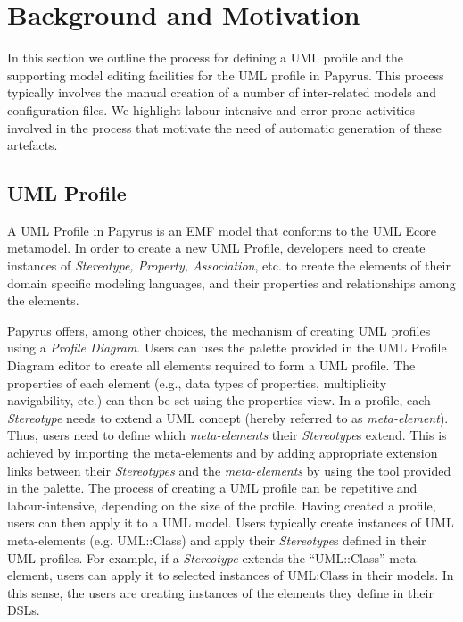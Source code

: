 \section{Background and Motivation}
\label{sec:background}

In this section we outline the process for defining a UML profile and the supporting model editing facilities for the UML profile in Papyrus. 
This process typically involves the manual creation of a number of inter-related models and configuration files.
We highlight labour-intensive and error prone activities involved in the process that motivate the need of automatic generation of these artefacts.

\subsection{UML Profile}
A UML Profile in Papyrus is an EMF model that conforms to the UML Ecore metamodel. 
In order to create a new UML Profile, developers need to create instances of \textit{Stereotype, Property, Association}, etc. to create the elements of their domain specific modeling languages, and their properties and relationships among the elements.

Papyrus offers, among other choices, the mechanism of creating UML profiles using a \textit{Profile Diagram}. 
Users can uses the palette provided in the UML Profile Diagram editor to
create all elements required to form a UML profile.
The properties of each element (e.g., data types of properties, multiplicity navigability, etc.) can then be set using the properties view. 
In a profile, each \textit{Stereotype} needs to extend a UML concept (hereby referred to as \textit{meta-element}). 
Thus, users need to define which \textit{meta-elements} their \textit{Stereotype}s extend. 
This is achieved by importing the meta-elements and by adding appropriate extension links between their \textit{Stereotypes} and the \textit{meta-elements} by using the tool provided in the palette.
The process of creating a UML profile can be repetitive and labour-intensive, depending on the size of the profile.
Having created a profile, users can then apply it to a UML model. 
Users typically create instances of UML meta-elements (e.g. UML::Class) and apply their \textit{Stereotype}s defined in their UML profiles. 
For example, if a \textit{Stereotype} extends the ``UML::Class'' meta-element, users can apply it to selected instances of UML:Class in their models. 
In this sense, the users are creating instances of the elements they define in their DSLs. 

